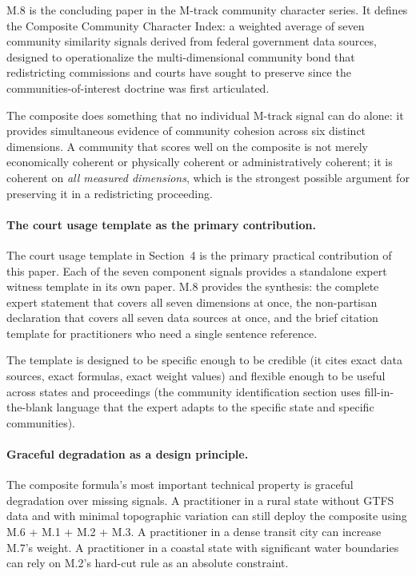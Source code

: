\label{sec:conclusion}

M.8 is the concluding paper in the M-track community character series.
It defines the Composite Community Character Index: a weighted average of
seven community similarity signals derived from federal government data sources,
designed to operationalize the multi-dimensional community bond that
redistricting commissions and courts have sought to preserve since the
communities-of-interest doctrine was first articulated.

The composite does something that no individual M-track signal can do alone:
it provides simultaneous evidence of community cohesion across six distinct
dimensions.
A community that scores well on the composite is not merely economically
coherent or physically coherent or administratively coherent; it is coherent
on \emph{all measured dimensions}, which is the strongest possible argument
for preserving it in a redistricting proceeding.

\paragraph{The court usage template as the primary contribution.}
The court usage template in Section~4 is the primary practical contribution
of this paper.
Each of the seven component signals provides a standalone expert witness
template in its own paper.
M.8 provides the synthesis: the complete expert statement that covers all
seven dimensions at once, the non-partisan declaration that covers all
seven data sources at once, and the brief citation template for practitioners
who need a single sentence reference.

The template is designed to be specific enough to be credible (it cites exact
data sources, exact formulas, exact weight values) and flexible enough to be
useful across states and proceedings (the community identification section
uses fill-in-the-blank language that the expert adapts to the specific
state and specific communities).

\paragraph{Graceful degradation as a design principle.}
The composite formula's most important technical property is graceful
degradation over missing signals.
A practitioner in a rural state without GTFS data and with minimal topographic
variation can still deploy the composite using M.6 + M.1 + M.2 + M.3.
A practitioner in a dense transit city can increase M.7's weight.
A practitioner in a coastal state with significant water boundaries can rely
on M.2's hard-cut rule as an absolute constraint.

